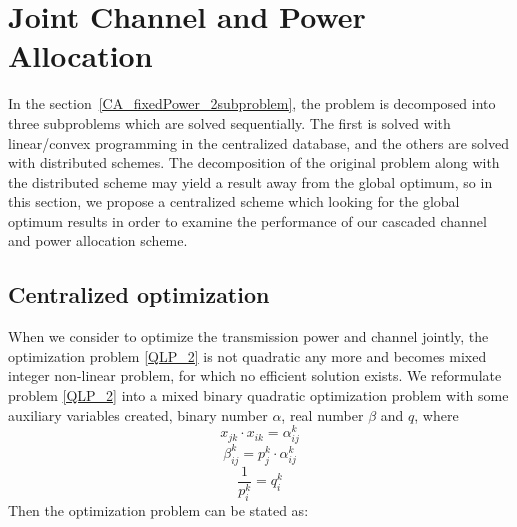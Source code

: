 \section{Joint Channel and Power Allocation}
In the section~\ref{CA_fixedPower_2subproblem}, the problem is decomposed into three subproblems which are solved sequentially.
The first is solved with linear/convex programming in the centralized database, and the others are solved with distributed schemes.
The decomposition of the original problem along with the distributed scheme may yield a result away from the global optimum, so in this section, we propose a centralized scheme which looking for the global optimum results in order to examine the performance of our cascaded channel and power allocation scheme.


\subsection{Centralized optimization}
\label{opt_channelAndPower}
When we consider to optimize the transmission power and channel jointly, the optimization problem \ref{QLP_2} is not quadratic any more and becomes mixed integer non-linear problem, for which no efficient solution exists.
We reformulate problem \ref{QLP_2} into a mixed binary quadratic optimization problem with some auxiliary variables created, \ie binary number $\alpha$, real number $\beta$ and $q$, where
	\begin{equation}
	\label{alpha_opt}
x_{jk}\cdot x_{ik} =\alpha_{ij}^k
	\end{equation}
	\begin{equation}
	\label{beta_opt}
\beta_{ij}^k = p_j^k\cdot \alpha_{ij}^k
	\end{equation}
	\begin{equation}
	\label{q_opt}	
\frac{1}{p_i^k} = q_i^k
	\end{equation}
Then the optimization problem can be stated as:
